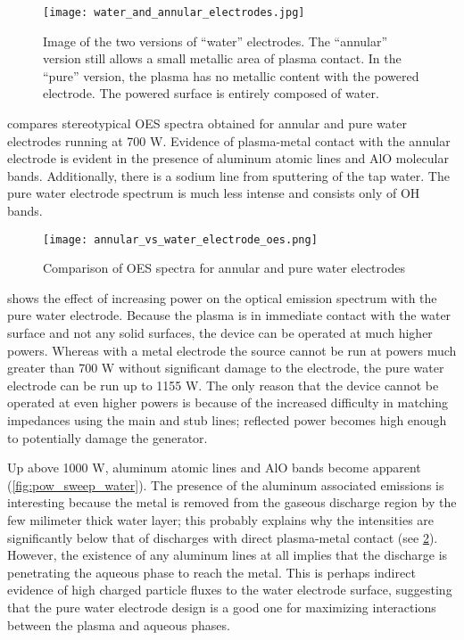 \begin{figure}[htbp]
  \centering
  \texttt{[image: water\_and\_annular\_electrodes.jpg]}
  \caption{Image of the two versions of ``water'' electrodes. The ``annular'' version still allows a small metallic area of plasma contact. In the ``pure'' version, the plasma has no metallic content with the powered electrode. The powered surface is entirely composed of water.}
  \label{fig:water_electrodes_image}
\end{figure}

 compares stereotypical OES spectra obtained for annular and pure water electrodes running at 700 W. Evidence of plasma-metal contact with the annular electrode is evident in the presence of aluminum atomic lines and AlO molecular bands. Additionally, there is a sodium line from sputtering of the tap water. The pure water electrode spectrum is much less intense and consists only of OH bands.

\begin{figure}[htbp]
  \centering
  \texttt{[image: annular\_vs\_water\_electrode\_oes.png]}
  \caption{Comparison of OES spectra for annular and pure water electrodes}
  \label{fig:annular_vs_water_oes}
\end{figure}

 shows the effect of increasing power on the optical emission spectrum with the pure water electrode. Because the plasma is in immediate contact with the water surface and not any solid surfaces, the device can be operated at much higher powers. Whereas with a metal electrode the source cannot be run at powers much greater than 700 W without significant damage to the electrode, the pure water electrode can be run up to 1155 W. The only reason that the device cannot be operated at even higher powers is because of the increased difficulty in matching impedances using the main and stub lines; reflected power becomes high enough to potentially damage the generator.

Up above 1000 W, aluminum atomic lines and AlO bands become apparent (\cref{fig:pow_sweep_water}). The presence of the aluminum associated emissions is interesting because the metal is removed from the gaseous discharge region by the few milimeter thick water layer; this probably explains why the intensities are significantly below that of discharges with direct plasma-metal contact (see \cref{fig:annular_vs_water_oes}). However, the existence of any aluminum lines at all implies that the discharge is penetrating the aqueous phase to reach the metal. This is perhaps indirect evidence of high charged particle fluxes to the water electrode surface, suggesting that the pure water electrode design is a good one for maximizing interactions between the plasma and aqueous phases.

